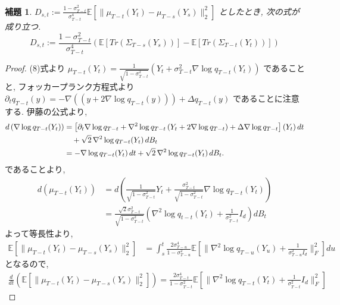 \documentclass[11pt,a4paper]{ltjsarticle}
\newtheorem{lemma}[theorem]{補題}
\theoremstyle{remark}
\begin{document}
\begin{lemma}
    $D_{s,t}:=\frac{1-\sigma^2_{T-t}}{\sigma^4_{T-t}}\mathbb{E}[\|\mu_{T-t}(Y_t)-\mu_{T-s}(Y_s)\|^2_2]$ としたとき, 次の式が成り立つ.
    \begin{equation}
        D_{s,t}:=\frac{1-\sigma^2_{T-t}}{\sigma^4_{T-t}}(\mathbb{E}[Tr(\Sigma_{T-s}(Y_s))]-\mathbb{E}[Tr(\Sigma_{T-t}(Y_t))])
    \end{equation}
\end{lemma}
\begin{proof}
    (8)式より $\mu_{T-t}(Y_t)=\frac{1}{\sqrt{1-\sigma^2_{T-t}}}(Y_t+\sigma^2_{T-t}\nabla \log{q_{T-t}(Y_t)})$ であることと, フォッカープランク方程式より
    $\partial_tq_{T-t}(y)=-\nabla((y+2\nabla\log{q_{T-t}}(y)))+\Delta q_{T-t}(y)$ であることに注意する.
    伊藤の公式より, 
    \begin{align}
        d\left(\nabla\log q_{T-t}(Y_t)\right)
        &=
        \left[
            \partial_t \nabla\log q_{T-t}
            +
            \nabla^2\log q_{T-t}
            \left(
                Y_t+2\nabla\log q_{T-t}
            \right)
            +
            \Delta\nabla\log q_{T-t}
        \right](Y_t)\,dt
        \notag\\
        &\quad
        +
        \sqrt{2}\,
        \nabla^2\log q_{T-t}(Y_t)\,dB_t
        \notag\\
        &=
        -\nabla\log q_{T-t}(Y_t)\,dt
        +
        \sqrt{2}\,
        \nabla^2\log q_{T-t}(Y_t)\,dB_t .
    \end{align}
    であることより,
    \begin{align}
        d(\mu_{T-t}(Y_t))&=d(\frac{1}{\sqrt{1-\sigma^2_{T-t}}}Y_t+\frac{\sigma^2_{T-t}}{\sqrt{1-\sigma^2_{T-t}}}\nabla \log{q_{T-t}(Y_t)})\\
        &=\frac{\sqrt{2}\sigma^2_{T-t}}{\sqrt{1-\sigma^2_{T-t}}}(\nabla^2 \log{q_{t-t}(Y_t)}+\frac{1}{\sigma^2_{T-t}}I_d)dB_t
    \end{align}
    よって等長性より, 
    \begin{align}
        \mathbb{E}[\|\mu_{T-t}(Y_t)-\mu_{T-s}(Y_s)\|^2_2]&=\int_{s}^{t}\frac{2\sigma^4_{T-u}}{1-\sigma^2_{T-u}}\mathbb{E}[\|\nabla^2\log{q_{T-u}(Y_u)+\frac{1}{\sigma^2_{T-u}I_d}}\|^2_F]du
    \end{align}
    となるので, 
    \begin{align}
            \frac{d}{dt}(\mathbb{E}[\|\mu_{T-t}(Y_t)-\mu_{T-s}(Y_s)\|^2_2])=\frac{2\sigma^4_{T-t}}{1-\sigma^2_{T-t}}\mathbb{E}[\|\nabla^2\log{q_{T-t}(Y_t)+\frac{1}{\sigma^2_{T-t}}I_d}\|^2_F]
    \end{align}

\end{proof}
\end{document}
